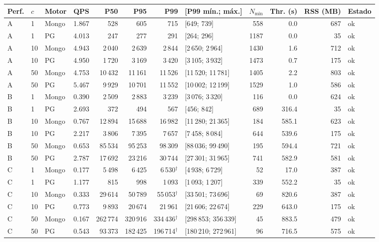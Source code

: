 \begin{tabular}{@{}llllrrrlrrrl@{}}
\toprule
Perf. & $c$ & Motor & QPS & P50 & P95 & P99 & [P99 mín.; máx.] & $N_{\min}$ & Thr. (s) & RSS (MB) & Estado \\
\midrule
A & 1 & Mongo & 1.867 & 528 & 605 & 715 & [649; 739] & 558 & 0.0 & 687 & ok \\
A & 1 & PG & 4.013 & 247 & 277 & 291 & [264; 296] & 1187 & 0.0 & 35 & ok \\
A & 10 & Mongo & 4.943 & 2\,040 & 2\,639 & 2\,844 & [2\,650; 2\,964] & 1430 & 1.6 & 712 & ok \\
A & 10 & PG & 4.950 & 1\,720 & 3\,169 & 3\,420 & [3\,105; 3\,932] & 1473 & 0.7 & 175 & ok \\
A & 50 & Mongo & 4.753 & 10\,432 & 11\,161 & 11\,526 & [11\,520; 11\,781] & 1405 & 2.2 & 803 & ok \\
A & 50 & PG & 5.467 & 9\,929 & 10\,701 & 11\,552 & [10\,002; 12\,199] & 1529 & 1.0 & 586 & ok \\
\addlinespace[2pt]
B & 1 & Mongo & 0.390 & 2\,509 & 2\,883 & 3\,239 & [3\,076; 3\,320] & 116 & 0.0 & 624 & ok \\
B & 1 & PG & 2.693 & 372 & 494 & 567 & [456; 842] & 689 & 316.4 & 35 & ok \\
B & 10 & Mongo & 0.767 & 12\,894 & 15\,688 & 16\,982 & [11\,280; 21\,365] & 184 & 585.1 & 623 & ok \\
B & 10 & PG & 2.217 & 3\,806 & 7\,395 & 7\,657 & [7\,458; 8\,084] & 644 & 539.6 & 175 & ok \\
B & 50 & Mongo & 0.653 & 85\,534 & 95\,253 & 98\,309 & [88\,036; 99\,490] & 195 & 594.4 & 721 & ok \\
B & 50 & PG & 2.787 & 17\,692 & 23\,216 & 30\,744 & [27\,301; 31\,965] & 741 & 582.9 & 581 & ok \\
\addlinespace[2pt]
C & 1 & Mongo & 0.177 & 5\,498 & 6\,425 & 6\,530$^{\dagger}$ & [4\,938; 6\,729] & 52 & 17.0 & 387 & ok \\
C & 1 & PG & 1.177 & 815 & 998 & 1\,093 & [1\,093; 1\,207] & 339 & 552.2 & 35 & ok \\
C & 10 & Mongo & 0.333 & 29\,614 & 50\,789 & 55\,053$^{\dagger}$ & [33\,501; 73\,696] & 69 & 820.6 & 387 & ok \\
C & 10 & PG & 0.773 & 9\,893 & 20\,674 & 21\,961 & [21\,606; 22\,674] & 229 & 643.0 & 175 & ok \\
C & 50 & Mongo & 0.167 & 262\,774 & 320\,916 & 334\,436$^{\dagger}$ & [298\,853; 356\,339] & 45 & 883.5 & 479 & ok \\
C & 50 & PG & 0.543 & 93\,373 & 182\,425 & 196\,714$^{\dagger}$ & [180\,210; 272\,961] & 96 & 716.5 & 575 & ok \\
\bottomrule
\end{tabular}
